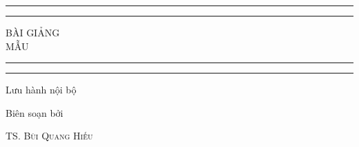 \documentclass[12pt,a4paper,twoside,openright]{book}
\theoremstyle{definition}
\begin{document}

\begin{titlepage} %

	\centering %
	
	\scshape %
	
	\vspace*{\baselineskip} %
	
	
	\rule{\textwidth}{1.6pt}\vspace*{-\baselineskip}\vspace*{2pt} %
	\rule{\textwidth}{0.4pt} %
	
	\vspace{0.75\baselineskip} %
	
	{\LARGE BÀI GIẢNG \\ MẪU} %
	
	\vspace{0.75\baselineskip} %
	
	\rule{\textwidth}{0.4pt}\vspace*{-\baselineskip}\vspace{3.2pt} %
	\rule{\textwidth}{1.6pt} %
	
	\vspace{2\baselineskip} %
	
	
	Lưu hành nội bộ %
	
	\vspace*{3\baselineskip} %
	
	
	Biên soạn bởi
	
	\vspace{0.5\baselineskip} %
	
	{\scshape\Large TS. Bùi Quang Hiếu} %
	
	\vspace{0.5\baselineskip} %
	

\end{titlepage}
\end{document}
